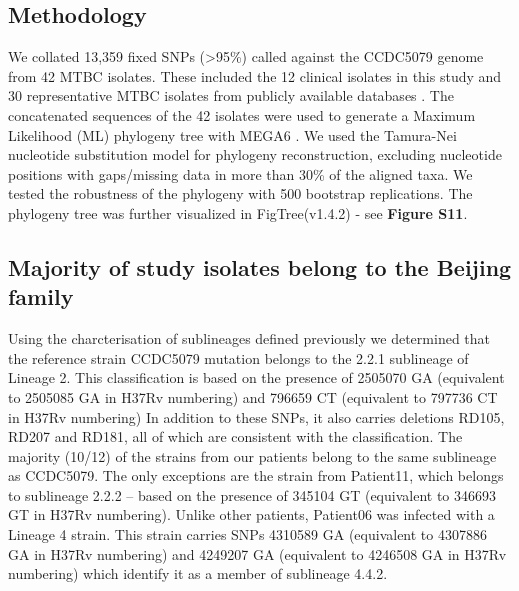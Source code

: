\documentclass[12pt, oneside]{article}   	%
\begin{document}
\subsection{Methodology}
We collated 13,359 fixed SNPs (>95\%) called against the CCDC5079 genome from 42 MTBC isolates. These included the 12 clinical isolates in this study and 30 representative MTBC isolates from publicly available databases \cite{Comas_tree}. The concatenated sequences of the 42 isolates were used to generate a Maximum Likelihood (ML) phylogeny tree with MEGA6 \cite{MEGA}. We used the Tamura-Nei nucleotide substitution model for phylogeny reconstruction, excluding nucleotide positions with gaps/missing data in more than 30\% of the aligned taxa. We tested the robustness of the phylogeny with 500 bootstrap replications. The phylogeny tree was further visualized in FigTree(v1.4.2) - see \textbf{Figure S11}.

\subsection{Majority of study isolates belong to the Beijing family}
Using the charcterisation of sublineages defined previously \cite{COLL} we determined that the reference strain CCDC5079 mutation belongs to the 2.2.1 sublineage of Lineage 2. This classification is based on the presence of 2505070 GA (equivalent to 2505085 GA in H37Rv numbering) and 796659 CT (equivalent to 797736 CT in H37Rv numbering)  In addition to these SNPs, it also carries deletions RD105, RD207 and RD181, all of which are consistent with the classification. The majority (10/12) of the strains from our patients belong to the same sublineage as CCDC5079. The only exceptions are the strain from Patient11, which belongs to sublineage 2.2.2 -- based on the presence of 345104 GT (equivalent to 346693 GT in H37Rv numbering).
Unlike other patients, Patient06 was infected with a Lineage 4 strain. This strain carries SNPs 4310589 GA (equivalent to 4307886 GA in H37Rv numbering) and 4249207 GA (equivalent to 4246508 GA in H37Rv numbering) which identify it as a member of sublineage 4.4.2.
\end{document}
